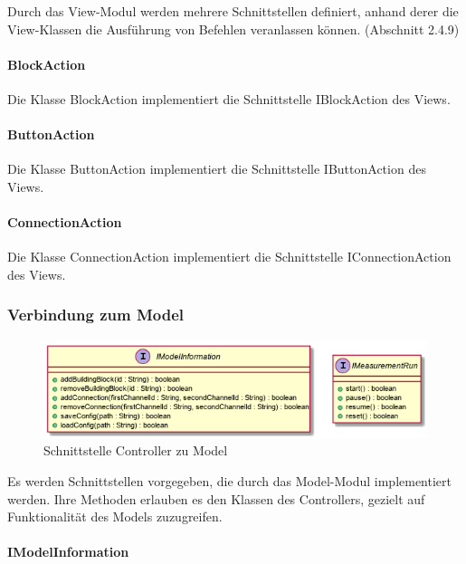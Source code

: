 \documentclass[parskip=full]{scrartcl}
\begin{document}
Durch das View-Modul werden mehrere Schnittstellen definiert, anhand derer die View-Klassen die Ausführung von Befehlen veranlassen können. (Abschnitt 2.4.9)

\paragraph{BlockAction} Die Klasse BlockAction implementiert die Schnittstelle IBlockAction des Views.

\paragraph{ButtonAction} Die Klasse ButtonAction implementiert die Schnittstelle IButtonAction des Views.

\paragraph{ConnectionAction} Die Klasse ConnectionAction implementiert die Schnittstelle IConnectionAction des Views.

\subsubsection{Verbindung zum Model}

\begin{figure}[htbp]
	\begin{center}
		\includegraphics[width = 14cm]{Grafiken/Controller_Model_Interface.png}
		\caption{Schnittstelle Controller zu Model}
		\label{Controller_Model_Interface}
	\end{center}
\end{figure}

Es werden Schnittstellen vorgegeben, die durch das Model-Modul implementiert werden. Ihre Methoden erlauben es den Klassen des Controllers, gezielt auf Funktionalität des Models zuzugreifen.

\paragraph{IModelInformation}
\end{document}
